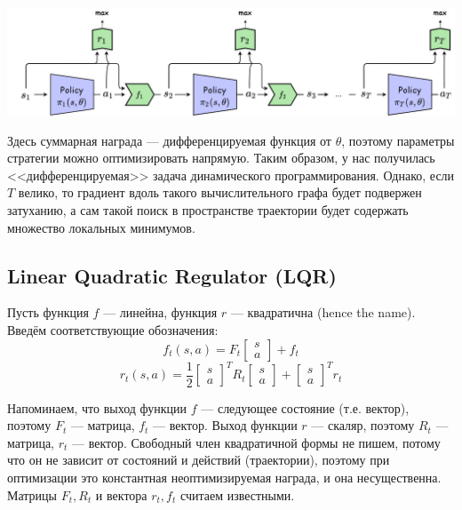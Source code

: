 \begin{center}
    \includegraphics[width=\textwidth]{Images/DDP.png}
\end{center}

Здесь суммарная награда --- дифференцируемая функция от $\theta$, поэтому параметры стратегии можно оптимизировать напрямую. Таким образом, у нас получилась <<дифференцируемая>> задача динамического программирования. Однако, если $T$ велико, то градиент вдоль такого вычислительного графа будет подвержен затуханию, а сам такой поиск в пространстве траектории будет содержать множество локальных минимумов.

\subsection{Linear Quadratic Regulator (LQR)}

Пусть функция $f$ --- линейна, функция $r$ --- квадратична (hence the name). Введём соответствующие обозначения:
\begin{equation}\label{lineardynamics}
f_t(s, a) = F_t \begin{bmatrix} s \\ a \end{bmatrix} + f_t
\end{equation}
$$r_t(s, a) = \frac{1}{2} \begin{bmatrix} s \\ a \end{bmatrix}^T R_t \begin{bmatrix} s \\ a \end{bmatrix} + \begin{bmatrix} s \\ a \end{bmatrix}^T r_t$$

Напоминаем, что выход функции $f$ --- следующее состояние (т.е. вектор), поэтому $F_t$ --- матрица, $f_t$ --- вектор. Выход функции $r$ --- скаляр, поэтому $R_t$ --- матрица, $r_t$ --- вектор. Свободный член квадратичной формы не пишем, потому что он не зависит от состояний и действий (траектории), поэтому при оптимизации это константная неоптимизируемая награда, и она несущественна. Матрицы $F_t, R_t$ и вектора $r_t, f_t$ считаем известными. 


